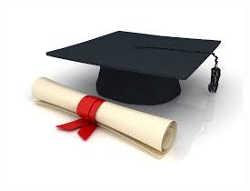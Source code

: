 \begin{itemize}
 
\begin{figure}[!ht]\centering
\includegraphics[scale=0.5]{ingenieur.jpg}
\end{figure}
\end{itemize}

